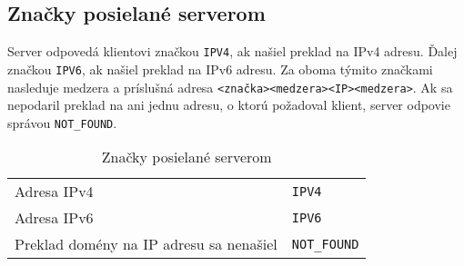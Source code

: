 \documentclass[10pt,a4paper]{article}
\begin{document}
\subsection{Značky posielané serverom}
Server odpovedá klientovi značkou \texttt{IPV4}, ak našiel preklad na IPv4
adresu. Ďalej značkou \texttt{IPV6}, ak našiel preklad na IPv6 adresu. Za oboma
týmito značkami nasleduje medzera a príslušná adresa
\texttt{<značka><medzera><IP><medzera>}. Ak sa nepodaril preklad 
na ani jednu adresu, o ktorú požadoval klient, server odpovie správou
\texttt{NOT\_FOUND}.

\begin{table}[h]
    \begin{center}
        \begin{tabular}{ll}
        Adresa IPv4 & \texttt{IPV4} \\
        Adresa IPv6 & \texttt{IPV6} \\
        Preklad domény na IP adresu sa nenašiel & \texttt{NOT\_FOUND}
        \end{tabular}
        \caption{Značky posielané serverom}
    \end{center}
\end{table}
\end{document}
